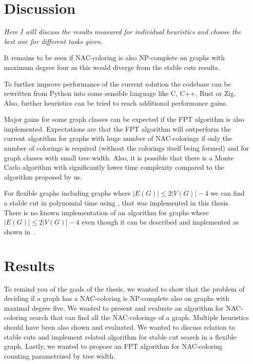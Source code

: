 
\chapter{Discussion}

\emph{Here I will discuss the results measured for individual heuristics
	and choose the best one for different tasks given.}

It remains to be seen if NAC-coloring is also NP-complete on graphs with
maximum degree four as this would diverge from the stable cuts results.

To further improve performance of the current solution the codebase
can be rewritten from Python into some sensible language like C, C++, Rust or Zig.
Also, further heuristics can be tried to reach additional performance  gains.

Major gains for some graph classes
can be expected if the FPT algorithm is also implemented.
Expectations are that the FPT algorithm will outperform the current algorithm
for graphs with huge number of NAC-colorings if only the number of colorings
is required (without the colorings itself being formed) and
for graph classes with small tree width.
Also, it is possible that there is a Monte Carlo algorithm with significantly
lower time complexity compared to the algorithm proposed by us.

For flexible graphs including graphs where \( |E(G)| \le 2|V(G)| - 4 \)
we can find a stable cut in polynomial time using ,
that was implemented in this thesis.
There is no known implementation of an algorithm
for graphs where \( |E(G)| \le 2|V(G)| - 4 \)
even though it can be described and implemented
as shown in~\cite{stable_cuts_2v_3,stable_cuts_2v_3_revisit}.

\chapter{Results}

To remind you of the goals of the thesis,
we wanted to show that the problem of deciding if a graph has a NAC-coloring
is NP-complete also on graphs with maximal degree five.
We wanted to present and evaluate an algorithm for NAC-coloring search
that can find all the NAC-colorings of a graph.
Multiple heuristics should have been also shown and evaluated.
We wanted to discuss relation to stable cuts and implement related algorithm
for stable cut search in a flexible graph.
Lastly, we wanted to propose an FPT algorithm for NAC-coloring counting
parametrized by tree width.

